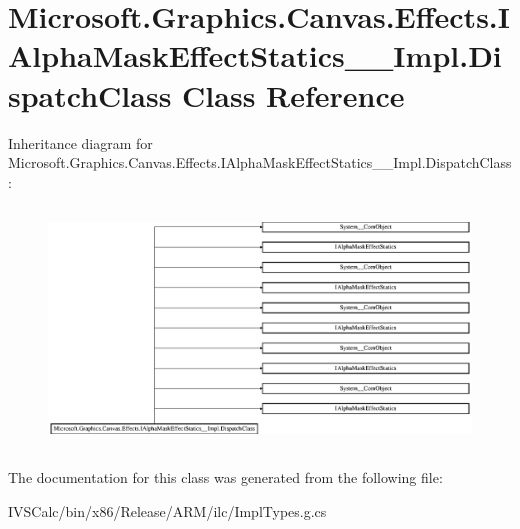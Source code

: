 \hypertarget{class_microsoft_1_1_graphics_1_1_canvas_1_1_effects_1_1_i_alpha_mask_effect_statics_____impl_1_1_dispatch_class}{}\section{Microsoft.\+Graphics.\+Canvas.\+Effects.\+I\+Alpha\+Mask\+Effect\+Statics\+\_\+\+\_\+\+Impl.\+Dispatch\+Class Class Reference}
\label{class_microsoft_1_1_graphics_1_1_canvas_1_1_effects_1_1_i_alpha_mask_effect_statics_____impl_1_1_dispatch_class}
Inheritance diagram for Microsoft.\+Graphics.\+Canvas.\+Effects.\+I\+Alpha\+Mask\+Effect\+Statics\+\_\+\+\_\+\+Impl.\+Dispatch\+Class\+:\begin{figure}[H]
\begin{center}
\leavevmode
\includegraphics[height=6.443515cm]{class_microsoft_1_1_graphics_1_1_canvas_1_1_effects_1_1_i_alpha_mask_effect_statics_____impl_1_1_dispatch_class}
\end{center}
\end{figure}


The documentation for this class was generated from the following file\+:\begin{DoxyCompactItemize}
\item 
I\+V\+S\+Calc/bin/x86/\+Release/\+A\+R\+M/ilc/Impl\+Types.\+g.\+cs\end{DoxyCompactItemize}
